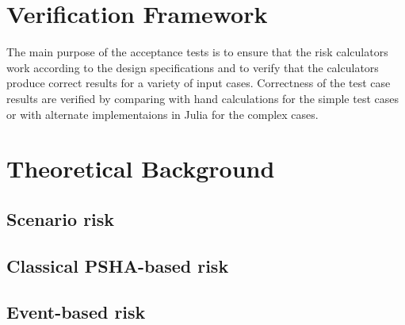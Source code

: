 \section{Verification Framework}
The main purpose of the acceptance tests is to ensure that the risk calculators work according to the design specifications and to verify that the calculators produce correct results for a variety of input cases. Correctness of the test case results are verified by comparing with hand calculations for the simple test cases or with alternate implementaions in Julia for the complex cases.

\section{Theoretical Background}
\subsection{Scenario risk}
   \label{subsec:theory-scenario}
   
\subsection{Classical PSHA-based risk}
   \label{subsec:theory-classical}
   
\subsection{Event-based risk}
   \label{subsec:theory-eventbased}
   
   \cleardoublepage